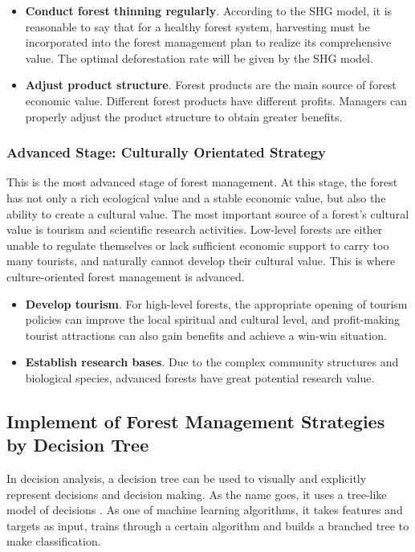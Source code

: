 \begin{itemize}
\item \textbf{Conduct forest thinning regularly}. According to the SHG model, it is reasonable to say that for a healthy forest system, harvesting must be incorporated into the forest management plan to realize its comprehensive value. The optimal deforestation rate will be given by the SHG model.
\item \textbf{Adjust product structure}. Forest products are the main source of forest economic value. Different forest products have different profits. Managers can properly adjust the product structure to obtain greater benefits.
\end{itemize}
\subsubsection{Advanced Stage: Culturally Orientated Strategy}

This is the most advanced stage of forest management. At this stage, the forest has not only a rich ecological value and a stable economic value, but also the ability to create a cultural value. The most important source of a forest's cultural value is tourism and scientific research activities. Low-level forests are either unable to regulate themselves or lack sufficient economic support to carry too many tourists, and naturally cannot develop their cultural value. This is where culture-oriented forest management is advanced.

\begin{itemize}
\item \textbf{Develop tourism}. For high-level forests, the appropriate opening of tourism policies can improve the local spiritual and cultural level, and profit-making tourist attractions can also gain benefits and achieve a win-win situation.
\item \textbf{Establish research bases}. 
Due to the complex community structures and biological species, advanced forests have great potential research value.
\end{itemize}

\subsection{Implement of Forest Management Strategies by Decision Tree}
In decision analysis, a decision tree can be used to visually and explicitly represent decisions and decision making. As the name goes, it uses a tree-like model of decisions \cite{decision tree}. As one of machine learning algorithms, it takes features and targets as input, trains through a certain algorithm and builds a branched tree to make classification.

